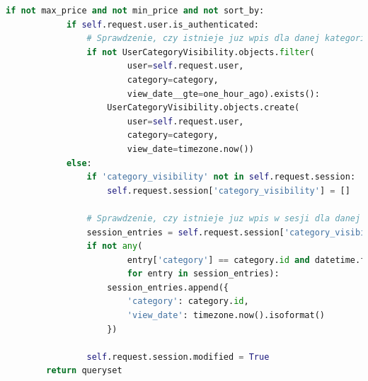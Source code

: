 \documentclass[12pt,a4paper,oneside]{article}
\theoremstyle{definition}
\numberwithin{equation}{section}
\begin{document}
\begin{itemize}
\begin{lstlisting}[language=Python, caption=Kod widoku CategoryProductsView]
        if not max_price and not min_price and not sort_by:
            if self.request.user.is_authenticated:
                # Sprawdzenie, czy istnieje juz wpis dla danej kategorii i uzytkownika w ciagu ostatniej godziny
                if not UserCategoryVisibility.objects.filter(
                        user=self.request.user,
                        category=category,
                        view_date__gte=one_hour_ago).exists():
                    UserCategoryVisibility.objects.create(
                        user=self.request.user,
                        category=category,
                        view_date=timezone.now())
            else:
                if 'category_visibility' not in self.request.session:
                    self.request.session['category_visibility'] = []

                # Sprawdzenie, czy istnieje juz wpis w sesji dla danej kategorii w ciagu ostatniej godziny
                session_entries = self.request.session['category_visibility']
                if not any(
                        entry['category'] == category.id and datetime.fromisoformat(entry['view_date']) >= one_hour_ago
                        for entry in session_entries):
                    session_entries.append({
                        'category': category.id,
                        'view_date': timezone.now().isoformat()
                    })

                self.request.session.modified = True
        return queryset
    \end{lstlisting}


\end{itemize}
\end{document}
